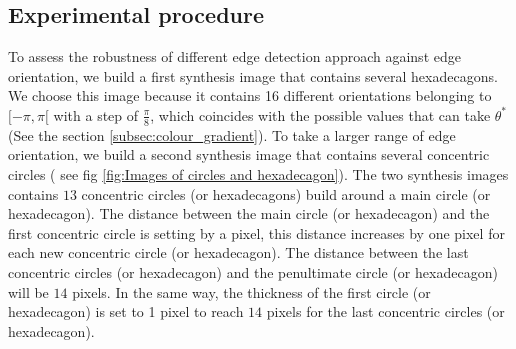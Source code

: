 \documentclass[twoside]{article}
\begin{document}
\subsection{Experimental procedure}
\label{subsec:Experimental procedure}
 To assess the robustness of different edge detection approach against edge orientation, we build a first synthesis image that contains several hexadecagons. We choose this image because it contains 16 different orientations belonging to $[-\pi,\pi[$ with a step of $\frac{\pi}{8}$, which coincides with the possible values that can take $\theta^{*}$ (See the section \ref{subsec:colour_gradient}).
 To take a larger range of edge orientation, we build a second synthesis image that contains several concentric circles ( see fig \ref{fig:Images of circles and hexadecagon}). The two synthesis images contains $13$ concentric circles (or hexadecagons) build around a main circle (or hexadecagon). The distance between the main circle (or hexadecagon) and the first concentric circle is setting by a pixel, this distance increases by one pixel for each new concentric circle (or hexadecagon). The distance between the last concentric circles (or hexadecagon) and the penultimate circle (or hexadecagon) will be $14$ pixels. In the same way, the thickness of the first circle (or hexadecagon) is set to 1 pixel to  reach $14$ pixels for the last concentric circles (or hexadecagon).
    
\end{document}
